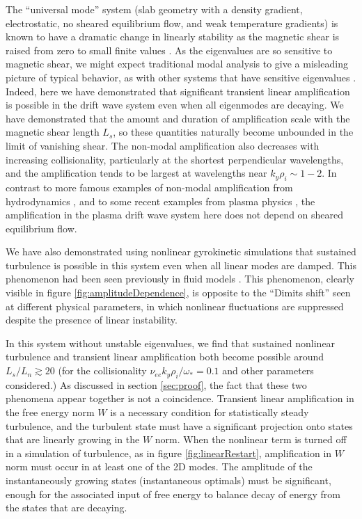 \documentclass[12pt,superscriptaddress]{revtex4}
\begin{document}
The ``universal mode'' system (slab geometry with a density gradient, electrostatic,
no sheared equilibrium flow, and weak temperature gradients)
is known to have a dramatic change in linearly stability
as the magnetic shear is raised from zero to small finite values
\cite{Ross, Tsang, Antonsen,usUniversalInstability}.
As the eigenvalues are so sensitive to magnetic shear,
we might expect traditional modal analysis to
give a misleading picture of typical behavior,
as with other systems that have sensitive eigenvalues \cite{TrefethenEmbree}.
Indeed, here we have demonstrated that significant
transient linear amplification is possible in the drift wave system even when
all eigenmodes are decaying.
We have demonstrated that the amount and duration of amplification scale
with the magnetic shear length $L_s$, so these quantities naturally become
unbounded in the limit of vanishing shear.
The non-modal amplification also decreases with increasing collisionality,
particularly at the shortest perpendicular wavelengths,
and the amplification tends to be largest at wavelengths near $k_y \rho_i \sim 1-2$.
In contrast to more famous examples of non-modal amplification
from hydrodynamics \cite{TrefethenSubcritical}, and to some recent examples from plasma physics \cite{Newton, Alex, BarnesRotation, EdmundPRL},
the amplification in the plasma drift wave system here
does not depend on sheared equilibrium flow.

We have also demonstrated using nonlinear gyrokinetic simulations
that sustained turbulence is possible in this system
even when all linear modes are damped.
This phenomenon had been seen previously
in fluid models \cite{Scott1, Scott2, Drake}.
This phenomenon, clearly visible in figure \ref{fig:amplitudeDependence},
is opposite to the ``Dimits shift'' seen at different physical parameters,
in which nonlinear fluctuations
are suppressed despite the presence of linear instability.

In this system without unstable eigenvalues, we find that sustained nonlinear turbulence
and transient linear amplification both become possible around $L_s / L_n \gtrsim 20$
(for the collisionality $\nu_{ee} k_y \rho_i / \omega_* = 0.1$ and other parameters considered.)
As discussed in section \ref{sec:proof}, the fact that these two phenomena appear together is not
a coincidence. Transient linear amplification in the free energy norm $W$ is a necessary condition for statistically steady
turbulence, and the turbulent state must have a significant projection onto states that are linearly growing in the $W$
norm.  When the nonlinear term is turned off in a simulation of turbulence, as in figure \ref{fig:linearRestart},
amplification in $W$ norm must occur in at least one of the 2D modes.
The amplitude of the instantaneously growing states (instantaneous optimals) must be
significant, enough for the associated input of free energy to balance decay of energy
from the states that are decaying.
\end{document}
